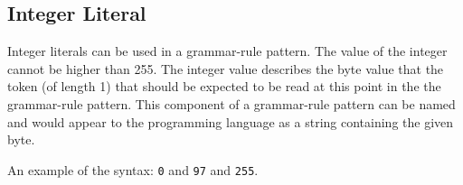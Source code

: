 
\subsection{Integer Literal}
{
	Integer literals can be used in a grammar-rule pattern.
	The value of the integer cannot be higher than 255.
	The integer value describes the byte value that the token (of length 1)
	that should be expected to be read at this point in the the grammar-rule
	pattern.
	This component of a grammar-rule pattern can be named and would appear to
	the programming language as a string containing the given byte.
	
	An example of the syntax: \texttt{0} and \texttt{97} and \texttt{255}.
}
